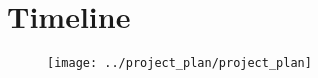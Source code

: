 \section{Timeline}
\vspace{2cm}
\begin{figure}[ht]
	\centering
	\texttt{[image: ../project\_plan/project\_plan]}
\end{figure}